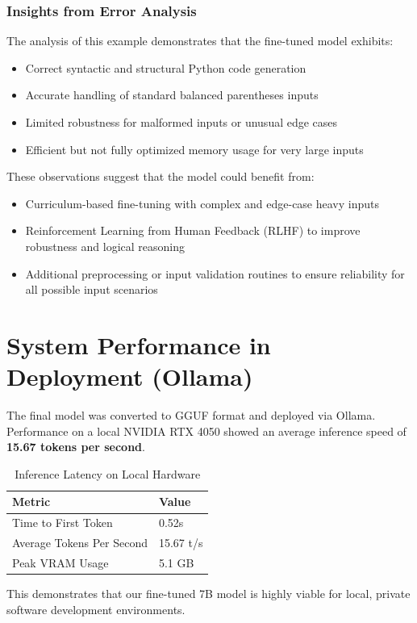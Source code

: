 \subsubsection{Insights from Error Analysis}

The analysis of this example demonstrates that the fine-tuned model exhibits:

\begin{itemize}
    \item Correct syntactic and structural Python code generation
    \item Accurate handling of standard balanced parentheses inputs
    \item Limited robustness for malformed inputs or unusual edge cases
    \item Efficient but not fully optimized memory usage for very large inputs
\end{itemize}

These observations suggest that the model could benefit from:

\begin{itemize}
    \item Curriculum-based fine-tuning with complex and edge-case heavy inputs
    \item Reinforcement Learning from Human Feedback (RLHF) to improve robustness and logical reasoning
    \item Additional preprocessing or input validation routines to ensure reliability for all possible input scenarios
\end{itemize}











\section{System Performance in Deployment (Ollama)}
The final model was converted to GGUF format and deployed via Ollama. Performance on a local NVIDIA RTX 4050 showed an average inference speed of \textbf{15.67 tokens per second}.



\begin{table}[h]
\centering
\caption{Inference Latency on Local Hardware}
\label{tab:latency}
\begin{tabular}{@{}ll@{}}
\toprule
\textbf{Metric} & \textbf{Value} \\ \midrule
Time to First Token & 0.52s \\
Average Tokens Per Second & 15.67 t/s \\
Peak VRAM Usage & 5.1 GB \\ \bottomrule
\end{tabular}
\end{table}
This demonstrates that our fine-tuned 7B model is highly viable for local, private software development environments.

